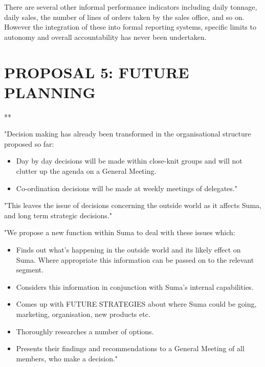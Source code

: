 There are several other informal performance indicators including daily tonnage, daily sales, the number of lines of orders taken by the sales office, and so on. However the integration of these into formal reporting systems, specific limits to autonomy and overall accountability has never been undertaken.

\section*{PROPOSAL 5: FUTURE PLANNING}
**

"Decision making has already been transformed in the organisational structure proposed so far:

\begin{itemize}
  \item Day by day decisions will be made within close-knit groups and will not clutter up the agenda on a General Meeting.

  \item Co-ordination decisions will be made at weekly meetings of delegates."

\end{itemize}

"This leaves the issue of decisions concerning the outside world as it affects Suma, and long term strategic decisions."

"We propose a new function within Suma to deal with these issues which:

\begin{itemize}
  \item Finds out what's happening in the outside world and its likely effect on Suma. Where appropriate this information can be passed on to the relevant segment.

  \item Considers this information in conjunction with Suma's internal capabilities.

  \item Comes up with FUTURE STRATEGIES about where Suma could be going, marketing, organisation, new products etc.

  \item Thoroughly researches a number of options.

  \item Presents their findings and recommendations to a General Meeting of all members, who make a decision."

\end{itemize}

